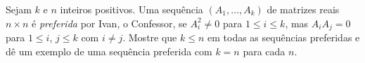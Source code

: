 Sejam \(k\) e \(n\) inteiros positivos. Uma sequência \(\left( A_1, \dots , A_k \right)\) de matrizes reais \(n\times n\) é \textit{preferida} por Ivan, o Confessor, se \(A_i^2\neq 0\) para \(1\le i\le k\), mas \(A_iA_j=0\) para \(1\le i\), \(j\le k\) com \(i\neq j\). Mostre que \(k\le n\) em todas as sequências preferidas e dê um exemplo de uma sequência preferida com \(k=n\) para cada \(n\).
